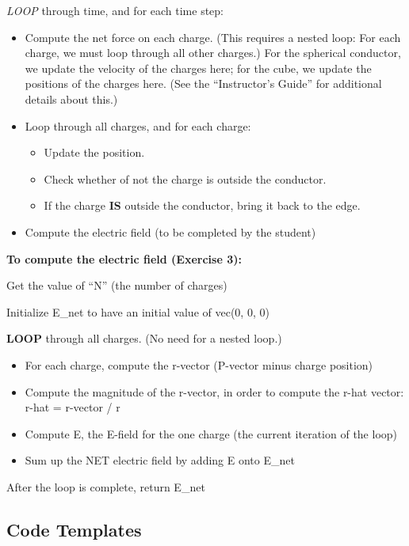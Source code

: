 \documentclass[]{article}
\providecommand{\tightlist}{%
  \setlength{\itemsep}{0pt}\setlength{\parskip}{0pt}}
\begin{document}
\emph{LOOP} through time, and for each time step:

\begin{itemize}
\tightlist
\item
  Compute the net force on each charge. (This requires a nested loop:
  For each charge, we must loop through all other charges.) For the
  spherical conductor, we update the velocity of the charges here; for
  the cube, we update the positions of the charges here. (See the
  ``Instructor's Guide'' for additional details about this.)
\item
  Loop through all charges, and for each charge:

  \begin{itemize}
  \tightlist
  \item
    Update the position.
  \item
    Check whether of not the charge is outside the conductor.
  \item
    If the charge \textbf{IS} outside the conductor, bring it back to
    the edge.
  \end{itemize}
\item
  Compute the electric field (to be completed by the student)
\end{itemize}

\textbf{To compute the electric field (Exercise 3):}

Get the value of ``N'' (the number of charges)

Initialize E\_net to have an initial value of vec(0, 0, 0)

\textbf{LOOP} through all charges. (No need for a nested loop.)

\begin{itemize}
\tightlist
\item
  For each charge, compute the r-vector (P-vector minus charge position)
\item
  Compute the magnitude of the r-vector, in order to compute the r-hat
  vector: r-hat = r-vector / r
\item
  Compute E, the E-field for the one charge (the current iteration of
  the loop)
\item
  Sum up the NET electric field by adding E onto E\_net
\end{itemize}

After the loop is complete, return E\_net

\subsection{Code Templates}\label{code-templates}
\end{document}
